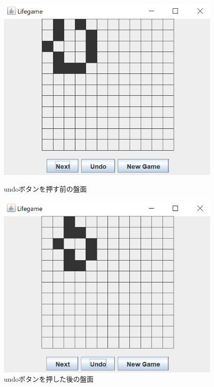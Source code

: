 \documentclass[dvipdfmx]{jarticle}
\begin{document}
\begin{figure}[htbp]
  \begin{minipage}[b]{0.45\linewidth}
    \centering
    \includegraphics[keepaspectratio, scale=0.35]{before_undo.png}
    \caption{undoボタンを押す前の盤面}
  \end{minipage}
  \begin{minipage}[b]{0.45\linewidth}
    \centering
    \includegraphics[keepaspectratio, scale=0.4]{after_undo.png}
    \caption{undoボタンを押した後の盤面}
  \end{minipage}
\end{figure}
\end{document}
